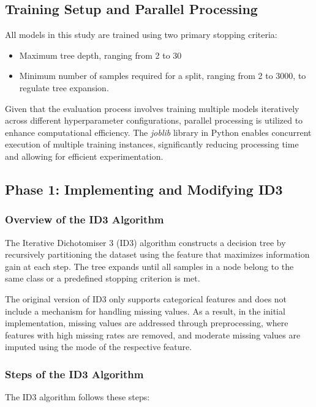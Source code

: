 \documentclass[12pt]{article}
\begin{document}
\subsection{Training Setup and Parallel Processing}
All models in this study are trained using two primary stopping criteria:

\begin{itemize}
    \item Maximum tree depth, ranging from 2 to 30
    \item Minimum number of samples required for a split, ranging from 2 to 3000, to regulate tree expansion.
\end{itemize}

Given that the evaluation process involves training multiple models iteratively across different hyperparameter configurations, parallel processing is utilized to enhance computational efficiency. The \textit{joblib} library in Python enables concurrent execution of multiple training instances, significantly reducing processing time and allowing for efficient experimentation.

\subsection{Phase 1: Implementing and Modifying ID3}

\subsubsection{Overview of the ID3 Algorithm}
The Iterative Dichotomiser 3 (ID3) algorithm constructs a decision tree by recursively partitioning the dataset using the feature that maximizes information gain at each step. The tree expands until all samples in a node belong to the same class or a predefined stopping criterion is met.

The original version of ID3 only supports categorical features and does not include a mechanism for handling missing values. As a result, in the initial implementation, missing values are addressed through preprocessing, where features with high missing rates are removed, and moderate missing values are imputed using the mode of the respective feature.

\subsubsection{Steps of the ID3 Algorithm}

The ID3 algorithm follows these steps:
\end{document}
